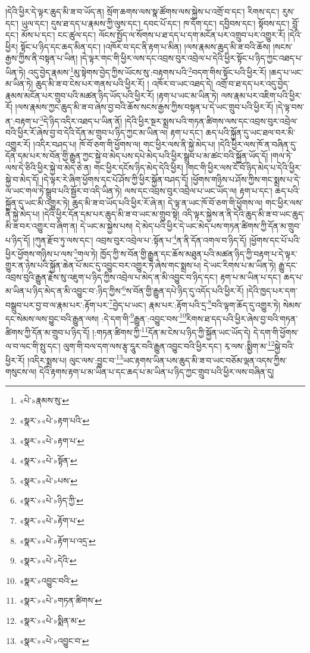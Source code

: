 །དེའི་ཕྱིར་དེ་ལྟར་ཆུད་མི་ཟ་བ་ཡོད་ན། སྲོག་ཆགས་ལས་སྣ་ཚོགས་ལས་སྐྱེས་པ་འགྲོ་བ་དང་། རིགས་དང་། རུས་དང་། ཡུལ་དང་། དུས་ཐ་དད་པ་རྣམས་ཀྱི་ལུས་དང་། དབང་པོ་དང་། ཁ་དོག་དང་། དབྱིབས་དང་། སྟོབས་དང་། བློ་དང་། མོས་པ་དང་། ངང་ཚུལ་དང་། ལོངས་སྤྱོད་ལ་སོགས་པ་ཐ་དད་པ་དག་མངོན་པར་འགྲུབ་པར་འགྱུར་རོ། །དེའི་ཕྱིར། སྟོང་པ་ཉིད་དང་ཆད་མིན་དང་། །འཁོར་བ་དང་ནི་རྟག་པ་མིན། །ལས་རྣམས་ཆུད་མི་ཟ་བའི་ཆོས། །སངས་རྒྱས་ཀྱིས་ནི་བསྟན་པ་ཡིན། །དེ་ལྟར་གང་གི་ཕྱིར་ལས་དང་འབྲས་བུར་འབྲེལ་པ་དེའི་ཕྱིར་སྟོང་པ་ཉིད་ཀྱང་འཐད་པ་ཡིན་ཏེ། འདུ་བྱེད་རྣམས་\footnote{«པེ་»རྣམས་སུ་}མུ་སྟེགས་བྱེད་ཀྱིས་ཡོངས་སུ་:བརྟགས་པའི་\footnote{«སྣར་»«པེ་»རྟག་པའི་}བདག་གིས་སྟོང་པའི་ཕྱིར་རོ། །ཆད་པ་ཡང་མ་ཡིན་ཏེ། ཆུད་མི་ཟ་བ་ངེས་པར་གནས་པའི་ཕྱིར་རོ། །
འཁོར་བ་ཡང་འཐད་དེ། འགྲོ་བ་ཐ་དད་པར་འདུ་བྱེད་རྣམས་མངོན་པར་གྲུབ་པའི་མཚན་ཉིད་ཡོད་པའི་ཕྱིར་རོ། །རྟག་པ་ཡང་མ་ཡིན་ཏེ། ལས་རྣམ་པར་འཇིག་པའི་ཕྱིར་རོ། །ལས་རྣམས་ཀྱང་ཆུད་མི་ཟ་བ་ཞེས་བྱ་བའི་ཆོས་སངས་རྒྱས་ཀྱིས་བསྟན་པ་དེ་ཡང་གྲུབ་པའི་ཕྱིར་རོ། །དེ་ལྟ་བས་ན་:བརྟག་པ་\footnote{«སྣར་»«པེ་»རྟག་པ་}དེ་ཉིད་འདིར་འཐད་པ་ཡིན་ནོ། །དེའི་ཕྱིར་སྔར་སྨྲས་པའི་གཏན་ཚིགས་ལས་དང་འབྲས་བུར་འབྲེལ་བའི་ཕྱིར་རོ་ཞེས་བྱ་བ་དེའི་དོན་མ་གྲུབ་པ་ཉིད་ཀྱང་མ་ཡིན་ལ། རྟག་པ་དང་། ཆད་པའི་སྐྱོན་དུ་ཡང་ཐལ་བར་མི་འགྱུར་རོ། །འདིར་བཤད་པ། ཁོ་བོ་ཅག་གི་ཕྱོགས་ལ། གང་ཕྱིར་ལས་ནི་སྐྱེ་མེད་པ། །དེའི་ཕྱིར་ལས་ཁོ་ན་བཞིན་དུ་དོན་དམ་པར་ས་བོན་གྱི་རྒྱུན་ཀྱང་སྐྱེ་བ་མེད་པས་དཔེ་མེད་པའི་ཕྱིར་སྒྲུབ་པ་མ་ཚང་བའི་སྐྱོན་ཡོད་དོ། །གལ་ཏེ་ལས་དེ་ཅིའི་ཕྱིར་སྐྱེ་བ་མེད་ཅེ་ན། གང་ཕྱིར་དངོས་ཉིད་མེད་དེའི་ཕྱིར། །གང་གི་ཕྱིར་ལས་ངོ་བོ་ཉིད་མེད་པ་དེའི་ཕྱིར་སྐྱེ་བ་མེད་དོ། །དེ་ལྟར་རེ་ཞིག་ཕྱོགས་དང་པོ་ཤོས་ཀྱི་ཕྱིར་སྐྱོན་བཤད་དོ། །ཕྱོགས་གཉིས་པ་ཤོས་ཀྱིས་གང་སྨྲས་པ་དེ་ལ་ཡང་གལ་ཏེ་སྒྲུབ་པའི་སྦྱོར་བ་འདི་ཡིན་ཏེ། ལས་དང་འབྲས་བུར་འབྲེལ་པ་ཡང་ཡོད་ལ། རྟག་པ་དང་། ཆད་པའི་སྐྱོན་དུ་ཡང་མི་འགྱུར་ཏེ། ཆུད་མི་ཟ་བ་ཡོད་པའི་ཕྱིར་རོ་ཞེ་ན། དེ་ལྟ་ན་ཡང་ཁོ་བོ་ཅག་གི་ཕྱོགས་ལ། གང་ཕྱིར་ལས་ནི་སྐྱེ་མེད་པ། །དེའི་ཕྱིར་དོན་དམ་པར་ཆུད་མི་ཟ་བ་ཡང་མ་གྲུབ་སྟེ། འདི་ལྟར་སྐྱེས་ན་ནི་དེའི་ཆུད་མི་ཟ་བ་ཡང་ཆུད་མི་ཟ་བར་འགྱུར་བ་ཞིག་ན། དེ་ཡང་མ་སྐྱེས་པས། དེ་མེད་པའི་ཕྱིར་དེ་ཡང་མེད་པས་གཏན་ཚིགས་ཀྱི་དོན་མ་གྲུབ་པ་ཉིད་དོ། །ཀུན་རྫོབ་ཏུ་ལས་དང་། འབྲས་བུར་འབྲེལ་པ་:སྟོན་པ་\footnote{«སྣར་»«པེ་»སྟོན་}ན་ནི་དོན་འགལ་བ་ཉིད་དོ། །ཕྱོགས་དང་པོ་པའི་ཕྱིར་ཕྱོགས་གཉིས་པ་ལས་\footnote{«སྣར་»«པེ་»པས་}གལ་ཏེ། ཁྱོད་ཀྱི་ས་བོན་གྱི་རྒྱུན་དང་ཆོས་མཐུན་པའི་མཚན་ཉིད་ཀྱི་བརྟག་པ་དེ་ལྟར་གྱུར་ན་ཉེས་པའི་སྐྱོན་ཆེན་པོ་མང་དུ་འབྱུང་བར་འགྱུར་ཏེ་ཞེས་གང་སྨྲས་པ། དེ་ཡང་རིགས་པ་མ་ཡིན་ཏེ། རྒྱུ་དང་འབྲས་བུའི་རྒྱུན་རྗེས་སུ་འཇུག་པ་ཉིད་ཀྱིས་འབྲེལ་པ་མེད་ན་མི་འབྱུང་བ་ཉིད་དང་། རྟག་པ་མ་ཡིན་པ་དང་། ཆད་པ་མ་ཡིན་པ་ཉིད་མེད་ན་མི་འབྱུང་བ་:ཉིད་ཀྱིས་\footnote{«སྣར་»«པེ་»ཉིད་ཀྱི་}ས་བོན་གྱི་རྒྱུན་དཔེ་ཉིད་དུ་འདོད་པའི་ཕྱིར་རོ། །དེའི་ཁྱད་པར་དག་བསྒྲུབ་པར་བྱ་བ་ལ་རྣམ་པར་:རྟོག་པར་\footnote{«སྣར་»«པེ་»རྟོག་པ་}བྱེད་པ་ཡང་། རྣམ་པར་:རྟོག་པའི་དྲ་\footnote{«སྣར་»«པེ་»རྟོག་པ་འདྲ་}བའི་ལྟག་ཆོད་དུ་འགྱུར་ཏེ། སེམས་དང་སེམས་ལས་བྱུང་བའི་རྒྱུན་ལས། :དེ་དག་གི་\footnote{«སྣར་»«པེ་»དེའི་}རྒྱུན་:འབྱུང་བས་\footnote{«སྣར་»འབྱུང་བའི་}རིགས་ཐ་དད་པའི་ཕྱིར་ཞེས་བྱ་བའི་གཏན་ཚིགས་ཀྱི་དོན་མ་གྲུབ་པ་ཉིད་དོ། །:གཏན་ཚིགས་ཀྱི་\footnote{«སྣར་»«པེ་»གཏན་ཚིགས་}དོན་མ་ངེས་པ་ཉིད་ཀྱི་སྐྱོན་ཡང་ཡོད་དེ། དེ་དག་གི་ཕྱོགས་ལ་བ་ལང་གི་སྤུ་དང་། ལུག་གི་བལ་དག་ལས་རྩྭ་དཱུར་བའི་རྒྱུན་འབྱུང་བའི་ཕྱིར་དང་། རྭ་ལས་:སྨྱིག་མ་\footnote{«སྣར་»«པེ་»སྨིན་མ་}སྐྱེ་བའི་ཕྱིར་རོ། །འདིར་སྨྲས་པ། ལུང་ལས་:བྱུང་བ་\footnote{«སྣར་»«པེ་»འབྱུང་བ་}ཡང་རྟགས་ཡིན་པས་ཆུད་མི་ཟ་བ་ཡང་བཅོམ་ལྡན་འདས་ཀྱིས་གསུངས་ལ། དེའི་རྟགས་རྟག་པ་མ་ཡིན་པ་དང་ཆད་པ་མ་ཡིན་པ་ཉིད་ཀྱང་གྲུབ་པའི་ཕྱིར་ལས་བཞིན་དུ། 